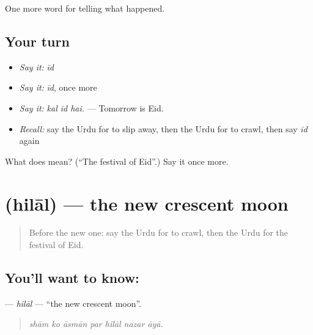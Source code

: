 \begin{grammarlens}[title={What you've built}]
One more word for telling what happened.
\end{grammarlens}

\subsection*{Your turn}
\begin{itemize}
\raggedright
  \item \emph{Say it:} \emph{īd}
  \item \emph{Say it:} \emph{īd}, once more
  \item \emph{Say it:} \emph{kal īd hai.} — Tomorrow is Eid.
  \item \emph{Recall:} say the Urdu for to slip away, then the Urdu for to crawl, then say \emph{īd} again
\end{itemize}

\begin{tcolorbox}[breakable,colback=teal!4,colframe=teal!35!black,title={Before you move on}]
What does  mean? (\textquotedblleft{}The festival of Eid\textquotedblright{}.) Say it once more.
\end{tcolorbox}
\section[\texorpdfstring{\ur{ہلال} (hilāl)}{ہلال (hilāl)}]{ (hilāl) — the new crescent moon}

\label{lesson:UR-C317-hilal}



\begin{quote}
Before the new one: say the Urdu for to crawl, then the Urdu for the festival of Eid.
\end{quote}

\subsection*{You'll want to know: }
\textbf{} — \emph{hilāl} — \textquotedblleft{}the new crescent moon\textquotedblright{}.

\begin{quote}
      
\end{quote}

\begin{quote}
\emph{shām ko āsmān par hilāl nazar āyā.}
\end{quote}

